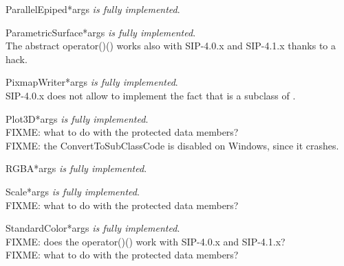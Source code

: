 \documentclass{manual}
\begin{document}
\begin{classdesc}{ParallelEpiped}{*args}
\emph{is fully implemented}.
\end{classdesc}

\begin{classdesc}{ParametricSurface}{*args}
\emph{is fully implemented}.\\
The abstract operator()() works also with SIP-4.0.x and SIP-4.1.x thanks to
a hack.
\end{classdesc}

\begin{classdesc}{PixmapWriter}{*args}
\emph{is fully implemented}.\\
SIP-4.0.x does not allow to implement the fact that  is a
subclass of .
\end{classdesc}

\begin{classdesc}{Plot3D}{*args}
\emph{is fully implemented}.\\
FIXME: what to do with the protected data members?\\
FIXME: the ConvertToSubClassCode is disabled on Windows, since it crashes.
\end{classdesc}

\begin{classdesc}{RGBA}{*args}
\emph{is fully implemented}.
\end{classdesc}

\begin{classdesc}{Scale}{*args}
\emph{is fully implemented}.\\
FIXME: what to do with the protected data members?
\end{classdesc}

\begin{classdesc}{StandardColor}{*args}
\emph{is fully implemented}.\\
FIXME: does the operator()() work with SIP-4.0.x and SIP-4.1.x?\\
FIXME: what to do with the protected data members?
\end{classdesc}
\end{document}
